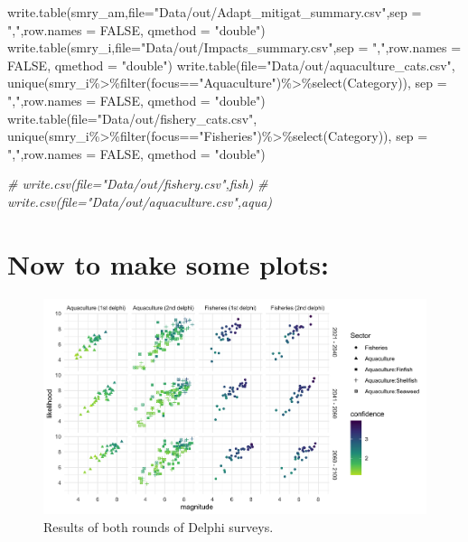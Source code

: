\documentclass[
]{article}
\newenvironment{Shaded}{\begin{snugshade}}{\end{snugshade}}
\newcommand{\AttributeTok}[1]{\textcolor[rgb]{0.77,0.63,0.00}{#1}}
\newcommand{\CommentTok}[1]{\textcolor[rgb]{0.56,0.35,0.01}{\textit{#1}}}
\newcommand{\ConstantTok}[1]{\textcolor[rgb]{0.00,0.00,0.00}{#1}}
\newcommand{\FunctionTok}[1]{\textcolor[rgb]{0.00,0.00,0.00}{#1}}
\newcommand{\NormalTok}[1]{#1}
\newcommand{\SpecialCharTok}[1]{\textcolor[rgb]{0.00,0.00,0.00}{#1}}
\newcommand{\StringTok}[1]{\textcolor[rgb]{0.31,0.60,0.02}{#1}}
\begin{document}
\begin{Shaded}
\begin{Highlighting}[]
    \FunctionTok{write.table}\NormalTok{(smry\_am,}\AttributeTok{file=}\StringTok{"Data/out/Adapt\_mitigat\_summary.csv"}\NormalTok{,}\AttributeTok{sep =} \StringTok{","}\NormalTok{,}\AttributeTok{row.names =} \ConstantTok{FALSE}\NormalTok{, }\AttributeTok{qmethod =} \StringTok{"double"}\NormalTok{)}
    \FunctionTok{write.table}\NormalTok{(smry\_i,}\AttributeTok{file=}\StringTok{"Data/out/Impacts\_summary.csv"}\NormalTok{,}\AttributeTok{sep =} \StringTok{","}\NormalTok{,}\AttributeTok{row.names =} \ConstantTok{FALSE}\NormalTok{, }\AttributeTok{qmethod =} \StringTok{"double"}\NormalTok{)}
    \FunctionTok{write.table}\NormalTok{(}\AttributeTok{file=}\StringTok{"Data/out/aquaculture\_cats.csv"}\NormalTok{,}
              \FunctionTok{unique}\NormalTok{(smry\_i}\SpecialCharTok{\%\textgreater{}\%}\FunctionTok{filter}\NormalTok{(focus}\SpecialCharTok{==}\StringTok{"Aquaculture"}\NormalTok{)}\SpecialCharTok{\%\textgreater{}\%}\FunctionTok{select}\NormalTok{(Category)),}
              \AttributeTok{sep =} \StringTok{","}\NormalTok{,}\AttributeTok{row.names =} \ConstantTok{FALSE}\NormalTok{,  }\AttributeTok{qmethod =} \StringTok{"double"}\NormalTok{)}
   \FunctionTok{write.table}\NormalTok{(}\AttributeTok{file=}\StringTok{"Data/out/fishery\_cats.csv"}\NormalTok{,}
              \FunctionTok{unique}\NormalTok{(smry\_i}\SpecialCharTok{\%\textgreater{}\%}\FunctionTok{filter}\NormalTok{(focus}\SpecialCharTok{==}\StringTok{"Fisheries"}\NormalTok{)}\SpecialCharTok{\%\textgreater{}\%}\FunctionTok{select}\NormalTok{(Category)),}
              \AttributeTok{sep =} \StringTok{","}\NormalTok{,}\AttributeTok{row.names =} \ConstantTok{FALSE}\NormalTok{,  }\AttributeTok{qmethod =} \StringTok{"double"}\NormalTok{)}

   \CommentTok{\# write.csv(file="Data/out/fishery.csv",fish)}
   \CommentTok{\# write.csv(file="Data/out/aquaculture.csv",aqua)}
\end{Highlighting}
\end{Shaded}

\hypertarget{now-to-make-some-plots}{%
\section{Now to make some plots:}\label{now-to-make-some-plots}}

\begin{figure}
\centering
\includegraphics{Figs/Fig1_impacts.png}
\caption{Results of both rounds of Delphi surveys.}
\end{figure}
\end{document}
